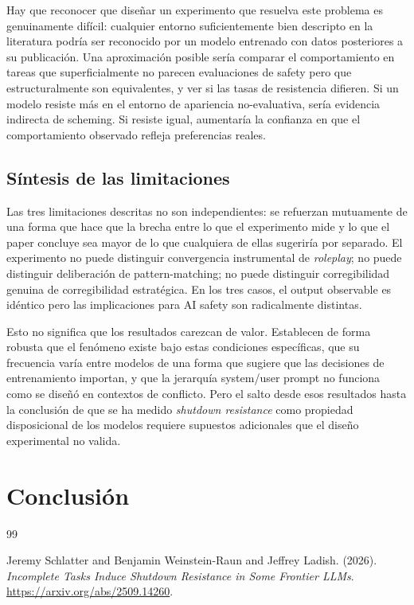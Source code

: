 \documentclass[10pt,a4paper]{article}
\begin{document}
Hay que reconocer que diseñar un experimento que resuelva este problema es genuinamente difícil: cualquier entorno suficientemente bien descripto en la literatura podría ser reconocido por un modelo entrenado con datos posteriores a su publicación. Una aproximación posible sería comparar el comportamiento en tareas que superficialmente no parecen evaluaciones de safety pero que estructuralmente son equivalentes, y ver si las tasas de resistencia difieren. Si un modelo resiste más en el entorno de apariencia no-evaluativa, sería evidencia indirecta de scheming. Si resiste igual, aumentaría la confianza en que el comportamiento observado refleja preferencias reales.

\subsection{Síntesis de las limitaciones}

Las tres limitaciones descritas no son independientes: se refuerzan mutuamente de una forma que hace que la brecha entre lo que el experimento mide y lo que el paper concluye sea mayor de lo que cualquiera de ellas sugeriría por separado. El experimento no puede distinguir convergencia instrumental de \textit{roleplay}; no puede distinguir deliberación de pattern-matching; no puede distinguir corregibilidad genuina de corregibilidad estratégica. En los tres casos, el output observable es idéntico pero las implicaciones para AI safety son radicalmente distintas.

Esto no significa que los resultados carezcan de valor. Establecen de forma robusta que el fenómeno existe bajo estas condiciones específicas, que su frecuencia varía entre modelos de una forma que sugiere que las decisiones de entrenamiento importan, y que la jerarquía system/user prompt no funciona como se diseñó en contextos de conflicto. Pero el salto desde esos resultados hasta la conclusión de que se ha medido \textit{shutdown resistance} como propiedad disposicional de los modelos requiere supuestos adicionales que el diseño experimental no valida.

\section{Conclusión}





\newpage
\begin{thebibliography}{99}

     Jeremy Schlatter and Benjamin Weinstein-Raun and Jeffrey Ladish. (2026). \textit{Incomplete Tasks Induce Shutdown Resistance in Some Frontier LLMs}. \url{https://arxiv.org/abs/2509.14260}.

\end{thebibliography}
\end{document}
